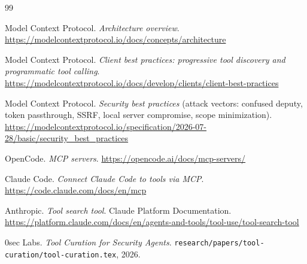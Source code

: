 \documentclass[11pt]{article}
\begin{document}
\begin{thebibliography}{99}

Model Context Protocol. \textit{Architecture overview}.
\url{https://modelcontextprotocol.io/docs/concepts/architecture}

Model Context Protocol. \textit{Client best practices: progressive tool
discovery and programmatic tool calling}.
\url{https://modelcontextprotocol.io/docs/develop/clients/client-best-practices}

Model Context Protocol. \textit{Security best practices} (attack vectors:
confused deputy, token passthrough, SSRF, local server compromise, scope
minimization).
\url{https://modelcontextprotocol.io/specification/2026-07-28/basic/security_best_practices}

OpenCode. \textit{MCP servers}.
\url{https://opencode.ai/docs/mcp-servers/}

Claude Code. \textit{Connect Claude Code to tools via MCP}.
\url{https://code.claude.com/docs/en/mcp}

Anthropic. \textit{Tool search tool}. Claude Platform Documentation.
\url{https://platform.claude.com/docs/en/agents-and-tools/tool-use/tool-search-tool}

0sec Labs. \textit{Tool Curation for Security Agents}.
\texttt{research/papers/tool-curation/tool-curation.tex}, 2026.

\end{thebibliography}
\end{document}
